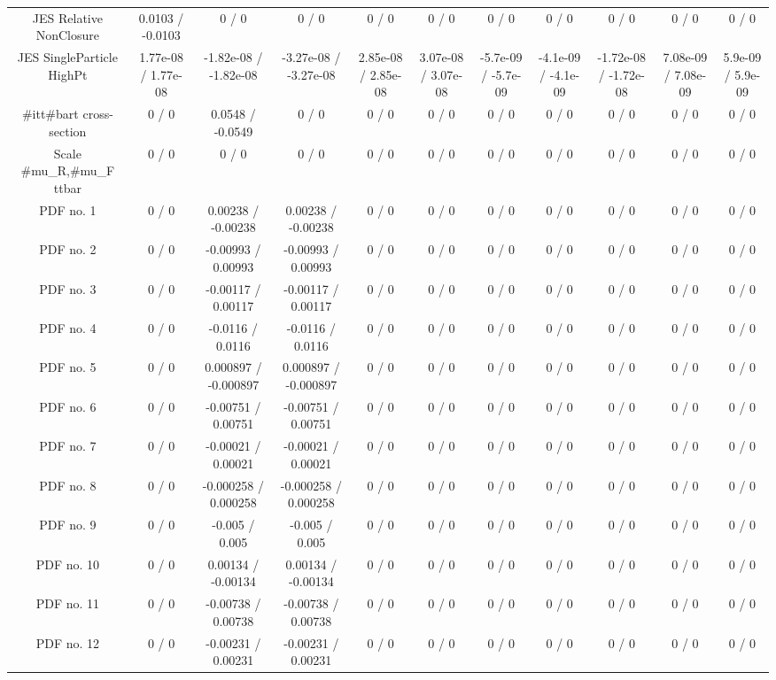 \begin{table}[htbp]
\begin{center}
\begin{tabular}{|c|c|c|c|c|c|c|c|c|c|c|}
  JES Relative NonClosure & 0.0103 / -0.0103 & 0 / 0 & 0 / 0 & 0 / 0 & 0 / 0 & 0 / 0 & 0 / 0 & 0 / 0 & 0 / 0 & 0 / 0 \\ 
  JES SingleParticle HighPt & 1.77e-08 / 1.77e-08 & -1.82e-08 / -1.82e-08 & -3.27e-08 / -3.27e-08 & 2.85e-08 / 2.85e-08 & 3.07e-08 / 3.07e-08 & -5.7e-09 / -5.7e-09 & -4.1e-09 / -4.1e-09 & -1.72e-08 / -1.72e-08 & 7.08e-09 / 7.08e-09 & 5.9e-09 / 5.9e-09 \\ 
  #it{t#bar{t}} cross-section & 0 / 0 & 0.0548 / -0.0549 & 0 / 0 & 0 / 0 & 0 / 0 & 0 / 0 & 0 / 0 & 0 / 0 & 0 / 0 & 0 / 0 \\ 
  Scale #mu_{R},#mu_{F} ttbar & 0 / 0 & 0 / 0 & 0 / 0 & 0 / 0 & 0 / 0 & 0 / 0 & 0 / 0 & 0 / 0 & 0 / 0 & 0 / 0 \\ 
  PDF no. 1 & 0 / 0 & 0.00238 / -0.00238 & 0.00238 / -0.00238 & 0 / 0 & 0 / 0 & 0 / 0 & 0 / 0 & 0 / 0 & 0 / 0 & 0 / 0 \\ 
  PDF no. 2 & 0 / 0 & -0.00993 / 0.00993 & -0.00993 / 0.00993 & 0 / 0 & 0 / 0 & 0 / 0 & 0 / 0 & 0 / 0 & 0 / 0 & 0 / 0 \\ 
  PDF no. 3 & 0 / 0 & -0.00117 / 0.00117 & -0.00117 / 0.00117 & 0 / 0 & 0 / 0 & 0 / 0 & 0 / 0 & 0 / 0 & 0 / 0 & 0 / 0 \\ 
  PDF no. 4 & 0 / 0 & -0.0116 / 0.0116 & -0.0116 / 0.0116 & 0 / 0 & 0 / 0 & 0 / 0 & 0 / 0 & 0 / 0 & 0 / 0 & 0 / 0 \\ 
  PDF no. 5 & 0 / 0 & 0.000897 / -0.000897 & 0.000897 / -0.000897 & 0 / 0 & 0 / 0 & 0 / 0 & 0 / 0 & 0 / 0 & 0 / 0 & 0 / 0 \\ 
  PDF no. 6 & 0 / 0 & -0.00751 / 0.00751 & -0.00751 / 0.00751 & 0 / 0 & 0 / 0 & 0 / 0 & 0 / 0 & 0 / 0 & 0 / 0 & 0 / 0 \\ 
  PDF no. 7 & 0 / 0 & -0.00021 / 0.00021 & -0.00021 / 0.00021 & 0 / 0 & 0 / 0 & 0 / 0 & 0 / 0 & 0 / 0 & 0 / 0 & 0 / 0 \\ 
  PDF no. 8 & 0 / 0 & -0.000258 / 0.000258 & -0.000258 / 0.000258 & 0 / 0 & 0 / 0 & 0 / 0 & 0 / 0 & 0 / 0 & 0 / 0 & 0 / 0 \\ 
  PDF no. 9 & 0 / 0 & -0.005 / 0.005 & -0.005 / 0.005 & 0 / 0 & 0 / 0 & 0 / 0 & 0 / 0 & 0 / 0 & 0 / 0 & 0 / 0 \\ 
  PDF no. 10 & 0 / 0 & 0.00134 / -0.00134 & 0.00134 / -0.00134 & 0 / 0 & 0 / 0 & 0 / 0 & 0 / 0 & 0 / 0 & 0 / 0 & 0 / 0 \\ 
  PDF no. 11 & 0 / 0 & -0.00738 / 0.00738 & -0.00738 / 0.00738 & 0 / 0 & 0 / 0 & 0 / 0 & 0 / 0 & 0 / 0 & 0 / 0 & 0 / 0 \\ 
  PDF no. 12 & 0 / 0 & -0.00231 / 0.00231 & -0.00231 / 0.00231 & 0 / 0 & 0 / 0 & 0 / 0 & 0 / 0 & 0 / 0 & 0 / 0 & 0 / 0 \\ 

\end{tabular}
\end{center}
\end{table}
